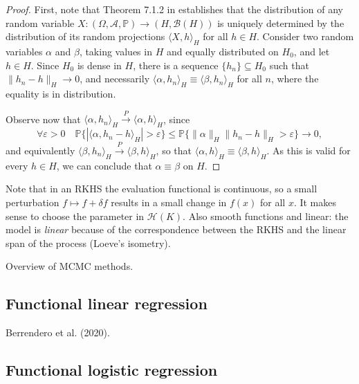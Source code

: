 \documentclass[ba]{imsart}
\numberwithin{equation}{section}
\theoremstyle{plain}
\renewcommand{\epsilon}{\varepsilon}
\newenvironment{comment}
{
\noindent \em \color{red}
}
{
\color{black}
}
\begin{document}
\begin{proof}

First, note that Theorem 7.1.2 in \citet[p.~177]{hsing2015theoretical} establishes that the distribution of any random variable \(X: (\Omega, \mathcal A, \mathbb{P})\to (H, \mathcal B(H))\) is uniquely determined by the distribution of its random projections \(\langle X, h\rangle_H\) for all \(h \in H\).
Consider two random variables \(\alpha\) and \(\beta\), taking values in \(H\) and equally distributed on \(H_0\), and let \(h \in H\). Since \(H_0\) is dense in \(H\), there is a sequence \(\{h_n\}\subseteq H_0\) such that \(\|h_n - h\|_H \to 0\), and necessarily \(\langle \alpha, h_n\rangle_H \equiv \langle \beta, h_n\rangle_H\) for all \(n\), where the equality is in distribution.

Observe now that \(\langle \alpha, h_n\rangle_H \overset{P}{\to} \langle \alpha, h\rangle_H\), since
\[
\forall \epsilon > 0 \quad \mathbb{P}\{|\langle \alpha, h_n - h\rangle_H| > \epsilon\} \leq \mathbb{P}\{\|\alpha\|_H \|h_n - h\|_H > \epsilon\} \to 0,
\]
and equivalently \(\langle \beta, h_n \rangle_H \overset{P}{\to} \langle \beta, h\rangle_H\), so that \(\langle \alpha, h \rangle_H \equiv \langle \beta,h\rangle_H\). As this is valid for every \(h \in H\), we can conclude that \(\alpha \equiv \beta\) on \(H\).
\end{proof}

\begin{comment}
  Note that in an RKHS the evaluation functional is continuous, so a small perturbation \(f\mapsto f + \delta f\) results in a small change in \(f(x)\) for all \(x\). It makes sense to choose the parameter in \(\mathcal H(K)\). Also smooth functions and linear: the model is \textit{linear} because of the correspondence between the RKHS and the linear span of the process (Loeve's isometry).
\end{comment}



\begin{comment}
  Overview of MCMC methods.
\end{comment}

\subsection{Functional linear regression}

Berrendero et al. (2020).

\subsection{Functional logistic regression}
\end{document}
